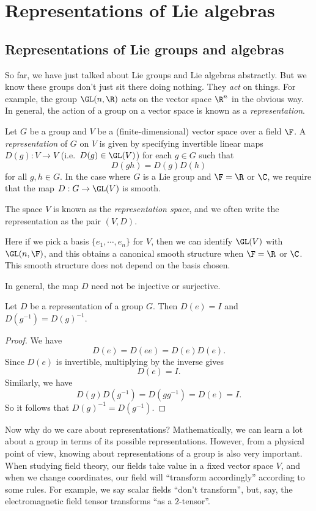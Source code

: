 \documentclass[a4paper]{article}
\begin{document}
\section{Representations of Lie algebras}
\subsection{Representations of Lie groups and algebras}
So far, we have just talked about Lie groups and Lie algebras abstractly. But we know these groups don't just sit there doing nothing. They \emph{act} on things. For example, the group $\GL(n,\R)$ acts on the vector space $\R^n$ in the obvious way. In general, the action of a group on a vector space is known as a \emph{representation}.

\begin{defi}
  Let $G$ be a group and $V$ be a (finite-dimensional) vector space over a field $\F$. A \emph{representation} of $G$ on $V$ is given by specifying invertible linear maps $D(g): V \to V$ (i.e.\ $D(g) \in \GL(V)$) for each $g \in G$ such that
  \[
    D(gh) = D(g)D(h)
  \]
  for all $g, h \in G$. In the case where $G$ is a Lie group and $\F = \R$ or $\C$, we require that the map $D: G \to \GL(V)$ is smooth.

  The space $V$ is known as the \emph{representation space}, and we often write the representation as the pair $(V, D)$.
\end{defi}
Here if we pick a basis $\{e_1, \cdots, e_n\}$ for $V$, then we can identify $\GL(V)$ with $\GL(n, \F)$, and this obtains a canonical smooth structure when $\F = \R$ or $\C$. This smooth structure does not depend on the basis chosen.

In general, the map $D$ need not be injective or surjective.

\begin{prop}
  Let $D$ be a representation of a group $G$. Then $D(e) = I$ and $D(g^{-1}) = D(g)^{-1}$.
\end{prop}

\begin{proof}
  We have
  \[
    D(e) = D(ee) = D(e) D(e).
  \]
  Since $D(e)$ is invertible, multiplying by the inverse gives
  \[
    D(e) = I.
  \]
  Similarly, we have
  \[
    D(g) D(g^{-1}) = D(gg^{-1})= D(e) = I.
  \]
  So it follows that $D(g)^{-1} = D(g^{-1})$.
\end{proof}

Now why do we care about representations? Mathematically, we can learn a lot about a group in terms of its possible representations. However, from a physical point of view, knowing about representations of a group is also very important. When studying field theory, our fields take value in a fixed vector space $V$, and when we change coordinates, our field will ``transform accordingly'' according to some rules. For example, we say scalar fields ``don't transform'', but, say, the electromagnetic field tensor transforms ``as a $2$-tensor''.
\end{document}
